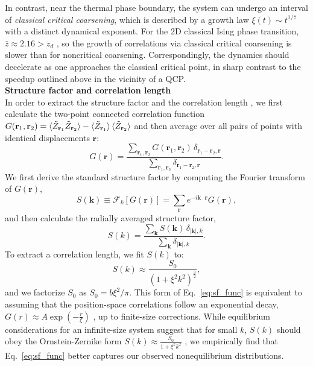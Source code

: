 \documentclass[reprint,twocolumn,secnumarabic,amssymb, aps, prx]{revtex4-2}
\begin{document}
In contrast, near the thermal phase boundary, the system can undergo an interval of \textit{classical critical coarsening}, which is described by a growth law $\xi (t) \sim t^{1/\bar{z}}$ with a distinct dynamical exponent. For the 2D classical Ising phase transition, $\bar{z} \approx 2.16 > z_d$ \cite{humayun1991non}, so the growth of correlations via classical critical coarsening is slower than for noncritical coarsening. Correspondingly, the dynamics should decelerate as one approaches  the classical critical point, in sharp contrast to the speedup outlined above in the vicinity of a QCP.\\

\noindent\textbf{Structure factor and correlation length}\\
In order to extract the structure factor and the correlation length \cite{sandvik2010computational}, we first calculate the two-point connected correlation function $G(\textbf{r}_1,\textbf{r}_2) =  \braket{\tilde{Z}_{\textbf{r}_1}\tilde{Z}_{\textbf{r}_2}}-\braket{\tilde{Z}_{\textbf{r}_1}}\braket{\tilde{Z}_{\textbf{r}_2}}$ and then average over all pairs of points with identical displacements $\textbf{r}$:
\begin{equation}
    G(\textbf{r}) = \frac{\sum_{\textbf{r}_1,\textbf{r}_2} G(\textbf{r}_1,\textbf{r}_2) \,\delta_{\textbf{r}_1-\textbf{r}_2,\textbf{r}}}{\sum_{\textbf{r}_1,\textbf{r}_2}\delta_{\textbf{r}_1-\textbf{r}_2,\textbf{r}}}.
\end{equation}
We first derive the standard structure factor by computing the Fourier transform of $G(\textbf{r})$,
\begin{equation}
    S(\textbf{k}) \equiv \mathcal{F}_k[G(\textbf{r})] = \sum_{\textbf{r}} e^{-i \textbf{k}\cdot \textbf{r} }G(\textbf{r}),
\end{equation}
and then calculate the radially averaged structure factor,
\begin{equation}
S(k)=\frac{\sum_{\textbf{k}}S(\textbf{k})\,\delta_{|\textbf{k}|,k}}{\sum_{\textbf{k}}\delta_{|\textbf{k}|,k}}.
\end{equation}
To extract a correlation length, we fit $S(k)$ to:
\begin{equation}
    S(k)\approx \frac{S_0}{(1+\xi^2 k^2)^{\frac{3}{2}}},
    \label{eq:sf_func}
\end{equation}
and we factorize $S_0$ as $S_0= b \xi^2/\pi$.
This form of Eq.~\eqref{eq:sf_func} is equivalent to assuming that the position-space correlations follow an exponential decay, $G(r)\approx A\exp({-\frac{r}{\xi}})$ \cite{ebadi2021quantum},  up to finite-size corrections. 
While equilibrium considerations for an infinite-size system suggest that for small $k$, $S(k)$ should obey the Ornstein-Zernike form $S(k)\approx \frac{S_0}{1+\xi^2 k^2}$ \cite{kennedy1991ornstein}, we empirically find that Eq.~\eqref{eq:sf_func} better captures our observed nonequilibrium distributions.
\end{document}
